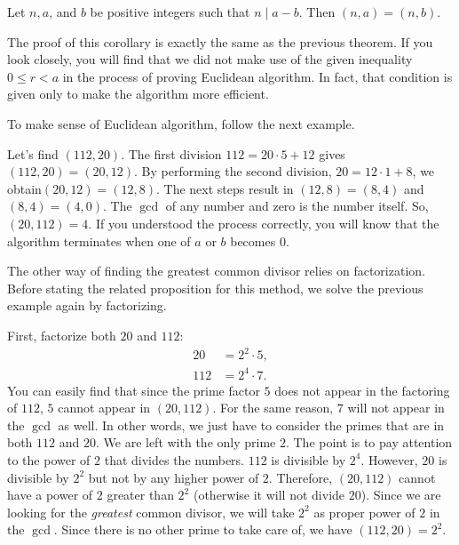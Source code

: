 \documentclass{subfile}
\begin{document}
	\begin{corollary}
		Let $n, a$, and $b$ be positive integers such that $n\mid a-b$. Then $(n,a)=(n,b)$.
	\end{corollary}

	The proof of this corollary is exactly the same as the previous theorem. If you look closely, you will find that we did not make use of the given inequality $0 \leq r < a$ in the process of proving Euclidean algorithm. In fact, that condition is given only to make the algorithm more efficient.

	To make sense of Euclidean algorithm, follow the next example.
	\begin{example}
		Let's find $(112,20)$. The first division $112=20\cdot 5+12$ gives $(112,20)=(20,12)$. By performing the second division, $20=12\cdot1+8$, we obtain$(20,12)=(12,8)$. The next steps result in $(12,8)=(8,4)$ and $(8,4)=(4,0)$. The $\gcd$ of any number and zero is the number itself. So, $(20,112)=4$. If you understood the process correctly, you will know that the algorithm terminates when one of $a$ or $b$ becomes $0$.
	\end{example}

	The other way of finding the greatest common divisor relies on factorization. Before stating the related proposition for this method, we solve the previous example again by factorizing.

	\begin{example}
		First, factorize both $20$ and $112$:
		\begin{align*}
			20  &= 2^2\cdot5,\\
			112 &= 2^4\cdot7.
		\end{align*}
		You can easily find that since the prime factor $5$ does not appear in the factoring of $112$, $5$ cannot appear in $(20,112)$. For the same reason, $7$ will not appear in the $\gcd$ as well. In other words, we just have to consider the primes that are in both $112$ and $20$. We are left with the only prime $2$. The point is to pay attention to the power of $2$ that divides the numbers. $112$ is divisible by $2^4$. However, $20$ is divisible by $2^2$ but not by any higher power of $2$. Therefore, $(20, 112)$ cannot have a power of $2$ greater than $2^2$ (otherwise it will not divide $20$). Since we are looking for the \textit{greatest} common divisor, we will take $2^2$ as proper power of $2$ in the $\gcd$. Since there is no other prime to take care of, we have $(112,20)=2^2$.
	\end{example}
\end{document}
